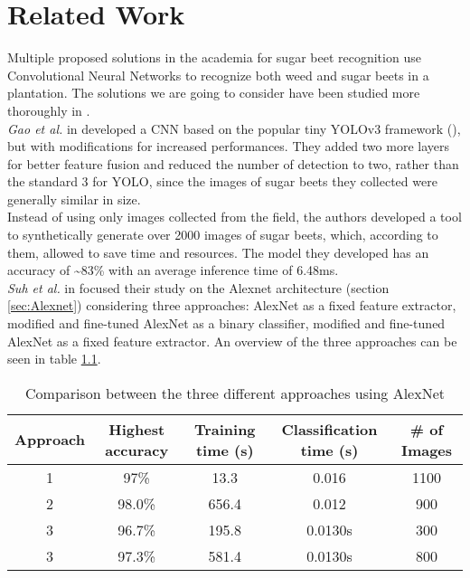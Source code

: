 \chapter{Related Work}
Multiple proposed solutions in the academia for sugar beet recognition use Convolutional Neural Networks to recognize both weed and sugar beets in a plantation. The solutions we are going to consider have been studied more thoroughly in \cite{project_work}. \\
\textit{Gao et al. } in \cite{gao_deep_2020} developed a CNN based on the popular tiny YOLOv3 framework (\cite{9074315}), but with modifications for increased performances. They added two more layers for better feature fusion and reduced the number of detection to two, rather than the standard 3 for YOLO, since the images of sugar beets they collected were generally similar in size.\\
Instead of using only images collected from the field, the authors developed a tool to synthetically generate over 2000 images of sugar beets, which, according to them, allowed to save time and resources. The model they developed has an accuracy of \textasciitilde83\% with an average inference time of 6.48ms.\\
\textit{Suh et al.} in \cite{suh_transfer_2018} focused their study on the Alexnet architecture (section \ref{sec:Alexnet}) considering three approaches: AlexNet as a fixed feature extractor, modified and fine-tuned AlexNet as a binary classifier, modified and fine-tuned AlexNet as a fixed feature extractor. An overview of the three approaches can be seen in table \ref{tab:alexnet_comparison}. 
\begin{table}[h]
\begin{tabular}[h]{ c c  c c c}
\hline
Approach & Highest accuracy & Training time (s) & Classification time (s) &\# of Images\\
\hline
  1	&	97\%		& 	13.3		&	0.016	&	1100 \\
  2 	& 	98.0\% 	& 	656.4	&	0.012	&	900 \\
  3 	& 	96.7\% 	& 	195.8 	&	0.0130s 	& 	300\\
  3 	& 	97.3\% 	& 	581.4 	&	0.0130s 	& 	800\\

\end{tabular}

\caption[Comparison between the three different approaches using AlexNet]{Comparison between the three different approaches using AlexNet \cite{suh_transfer_2018}}
 \label{tab:alexnet_comparison}
\end{table}

